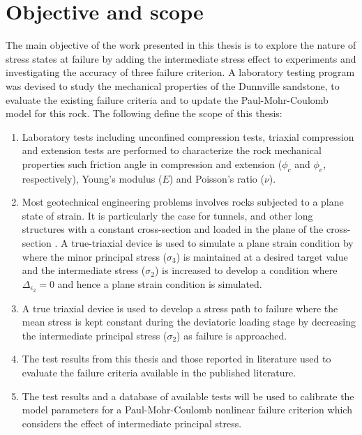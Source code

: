 \section{Objective and scope}

The main objective of the work presented in this thesis is to explore the nature of stress states at failure by adding the intermediate stress effect to experiments and investigating the accuracy of three failure criterion. A laboratory testing program was devised to study the mechanical properties of the Dunnville sandstone, to evaluate the existing failure criteria and to update the Paul-Mohr-Coulomb model for this rock. The following define the scope of this thesis:

\begin{enumerate}
    \item Laboratory tests including unconfined compression tests, triaxial compression and extension tests are performed to characterize the rock mechanical properties such friction angle in compression and extension ($\phi_c$ and $\phi_e$, respectively), Young’s modulus ($E$) and Poisson’s ratio ($\nu$).

    \item Most geotechnical engineering problems involves rocks subjected to a plane state of strain. It is particularly the case for tunnels, and other long structures with a constant cross-section and loaded in the plane of the cross-section \cite{Jaeger1979}. A true-triaxial device is used to simulate a plane strain condition by where the minor principal stress ($\sigma_3$) is maintained at a desired target value and the intermediate stress ($\sigma_2$) is increased to develop a condition where $\Delta_{\epsilon_2}=0$ and hence a plane strain condition is simulated.

    \item A true triaxial device is used to develop a stress path to failure where the mean stress is kept constant during the deviatoric loading stage by decreasing the intermediate principal stress ($\sigma_2$) as failure is approached.

    \item The test results from this thesis and those reported in literature used to evaluate the failure criteria available in the published literature.

    \item The test results and a database of available tests will be used to calibrate the model parameters for a Paul-Mohr-Coulomb nonlinear failure criterion which considers the effect of intermediate principal stress.
\end{enumerate}




